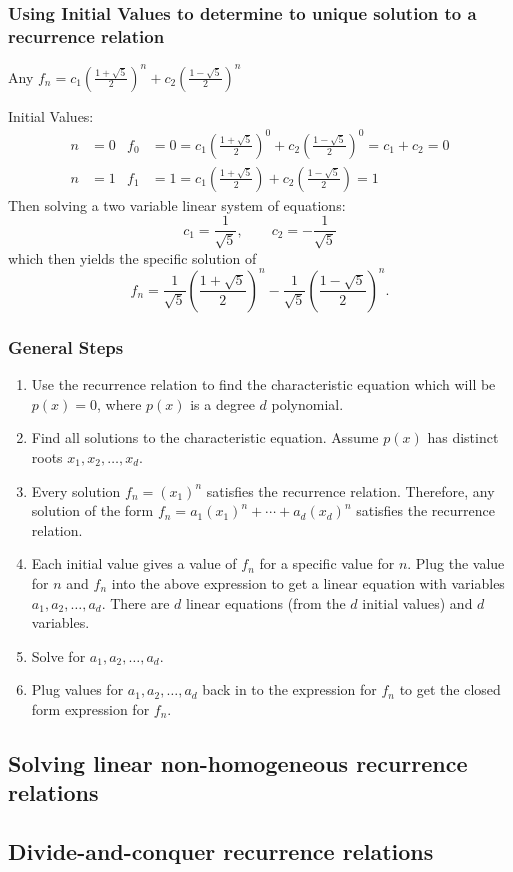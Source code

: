 \subsubsection*{Using Initial Values to determine to unique solution to a recurrence relation}
Any ${\displaystyle f_n = c_1\left(\frac{1 + \sqrt{5}}{2}\right)^n + c_2\left(\frac{1 - \sqrt{5}}{2}\right)^n}$

\noindent Initial Values:
\begin{align*}
  n & = 0 & f_0 & = 0 = c_1\left(\frac{1 + \sqrt{5}}{2}\right)^0 + c_2\left(\frac{1 - \sqrt{5}}{2}\right)^0 = c_1 + c_2 = 0 \\
  n & = 1 & f_1 & = 1 = c_1\left(\frac{1 + \sqrt{5}}{2}\right) + c_2\left(\frac{1 - \sqrt{5}}{2}\right) = 1
\end{align*}
Then solving a two variable linear system of equations:
\[
  c_1 = \frac{1}{\sqrt{5}}, \qquad c_2 = -\frac{1}{\sqrt{5}}
\]
which then yields the specific solution of
\[
  f_n = \frac{1}{\sqrt{5}}\left(\frac{1 + \sqrt{5}}{2}\right)^n - \frac{1}{\sqrt{5}}\left(\frac{1 - \sqrt{5}}{2}\right)^n.
\]

\subsubsection*{General Steps}
\begin{enumerate}
  \item Use the recurrence relation to find the characteristic equation which will be $p(x) = 0$, where $p(x)$ is a degree $d$ polynomial.
  \item Find all solutions to the characteristic equation. Assume $p(x)$ has distinct roots $x_1, x_2, \ldots, x_d$.
  \item Every solution $f_n = (x_1)^n$ satisfies the recurrence relation. Therefore, any solution of the form $f_n = a_1(x_1)^n + \cdots + a_d(x_d)^n$ satisfies the recurrence relation.
  \item Each initial value gives a value of $f_n$ for a specific value for $n$. Plug the value for $n$ and $f_n$ into the above expression to get a linear equation with variables $a_1,a_2,\ldots,a_d$. There are $d$ linear equations (from the $d$ initial values) and $d$ variables.
  \item Solve for $a_1,a_2,\ldots,a_d$.
  \item Plug values for $a_1,a_2,\ldots,a_d$ back in to the expression for $f_n$ to get the closed form expression for $f_n$.
\end{enumerate}

\subsection{Solving linear non-homogeneous recurrence relations}


\subsection{Divide-and-conquer recurrence relations}
